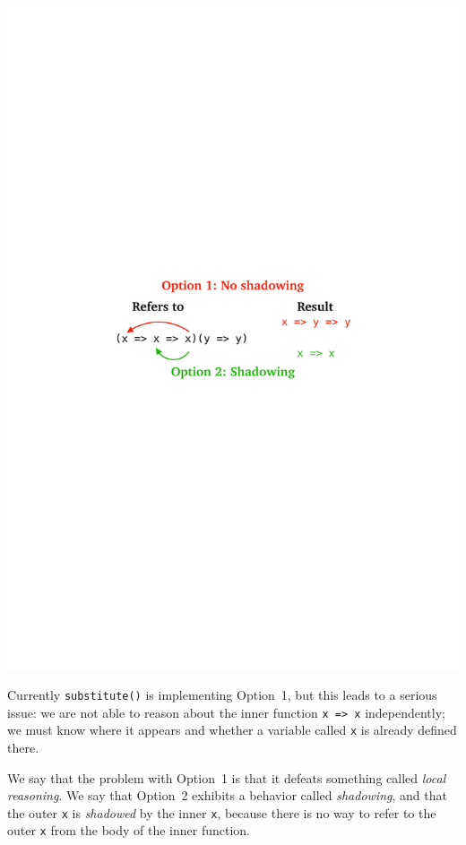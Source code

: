 \documentclass[12pt, oneside]{book}
\begin{document}
\begin{center}
\includegraphics{images/shadowing.pdf}
\end{center}

Currently \texttt{substitute()} is implementing Option~1, but this leads to a serious issue: we are not able to reason about the inner function \texttt{x => x} independently; we must know where it appears and whether a variable called \texttt{x} is already defined there.

\begin{mdframed}[frametitle = {Technical Terms}]
We say that the problem with Option~1 is that it defeats something called \emph{local reasoning}. We say that Option~2 exhibits a behavior called \emph{shadowing}, and that the outer \texttt{x} is \emph{shadowed} by the inner \texttt{x}, because there is no way to refer to the outer \texttt{x} from the body of the inner function.
\end{mdframed}
\end{document}
